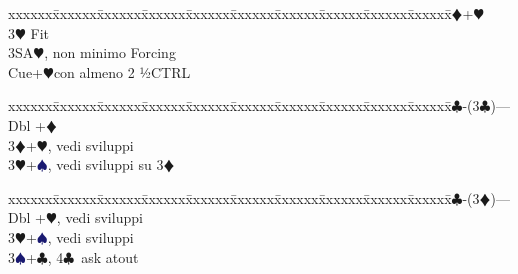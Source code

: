\documentclass[a4paper,italian]{article}
\newcommand{\BC}{\textcolor{OliveGreen}{$\clubsuit$}}
\newcommand{\BD}{\textcolor{RedOrange}{$\vardiamondsuit$}}
\newcommand{\BH}{\textcolor{Red2}{$\varheartsuit${}}}
\newcommand{\BS}{\textcolor{MidnightBlue}{$\spadesuit${}}}
\newenvironment{bidtable}
{\begin{tabbing}

    xxxxxx\=xxxxxx\=xxxxxx\=xxxxxx\=xxxxxx\=xxxxxx\=xxxxxx\=xxxxxx\=xxxxxx\=xxxxxx\=\kill}
{\end{tabbing} }%
\begin{document}
\begin{multicols}{2}
\begin{bidtable}
                                        3\BD {}+\BH\+\\
                                            3\BH\> Fit\+\\
                                                3SA\BH, non minimo Forcing\\
                                                Cue+\BH con almeno 2 ½CTRL\-\-\\
                                    \end{bidtable}
                                    \begin{bidtable}
                                        2\BC-(3\BC)---\\
                                        Dbl +\BD\\
                                        3\BD {}+\BH, vedi sviluppi\\
                                        3\BH {}+\BS, vedi sviluppi su 3\BD\\
                                    \end{bidtable}
                                    \begin{bidtable}
                                        2\BC-(3\BD)---\\
                                        Dbl +\BH, vedi sviluppi\\
                                        3\BH {}+\BS, vedi sviluppi\\
                                        3\BS {}+\BC, 4\BC\ ask atout
                                    \end{bidtable}
                                    \end{multicols}
                                    \newpage
\end{document}
